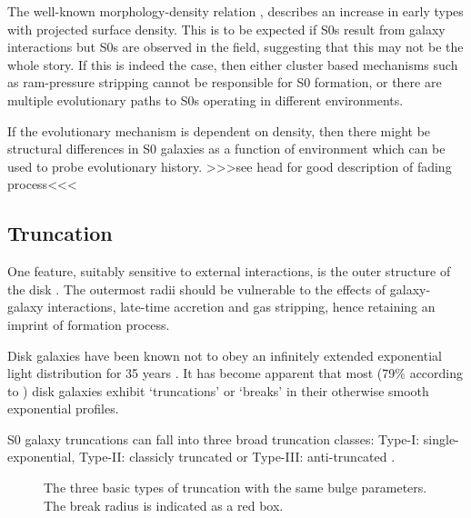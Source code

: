 The well-known morphology-density relation \citep{dressler_galaxy_1980}, describes an increase in early types with projected surface density. This is to be expected if S0s result from galaxy interactions but S0s are observed in the field, suggesting that this may not be the whole story. If this is indeed the case, then either cluster based mechanisms such as ram-pressure stripping cannot be responsible for S0 formation, or there are multiple evolutionary paths to S0s operating in different environments. 

If the evolutionary mechanism is dependent on density, then there might be structural differences in S0 galaxies as a function of environment which can be used to probe evolutionary history.
>>>see head for good description of fading process<<<

\subsection{Truncation}
One feature, suitably sensitive to external interactions, is the outer structure of the disk \citep{pohlen_stellar_2004}. The outermost radii should be vulnerable to the effects of galaxy-galaxy interactions, late-time accretion and gas stripping, hence retaining an imprint of formation process. 

Disk galaxies have been known not to obey an infinitely extended exponential light distribution for 35 years \citep{van_der_kruit_optical_1979}. It has become apparent that most (79\% according to \citet{pohlen_cut-off_2001}) disk galaxies exhibit `truncations' or `breaks' in their otherwise smooth exponential profiles. 

S0 galaxy truncations can fall into three broad truncation classes: Type-I: single-exponential, Type-II: classicly truncated \citep{freeman_disks_1970} or Type-III: anti-truncated \citep{erwin_antitruncation_2005}. 
\begin{figure}[h]
	\centering
	\caption{\footnotesize{The three basic types of truncation with the same bulge parameters. The break radius is indicated as a red box.}}
	\label{trunc_types}
\end{figure}

